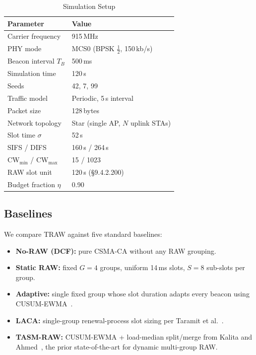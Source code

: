 \documentclass[conference]{IEEEtran}
\begin{document}
\begin{table}[!t]
\renewcommand{\arraystretch}{1.15}
\caption{Simulation Setup}
\label{tab:setup}
\centering
\begin{tabular}{@{}ll@{}}
\toprule
\textbf{Parameter} & \textbf{Value} \\
\midrule
Carrier frequency      & 915\,MHz \\
PHY mode               & MCS0 (BPSK $\frac{1}{2}$, 150\,kb/s) \\
Beacon interval $T_B$  & 500\,ms \\
Simulation time        & 120\,s \\
Seeds                  & 42, 7, 99 \\
Traffic model          & Periodic, 5\,s interval \\
Packet size            & 128\,bytes \\
Network topology       & Star (single AP, $N$ uplink STAs) \\
Slot time $\sigma$     & 52\,\textmu{}s \\
SIFS / DIFS            & 160\,\textmu{}s / 264\,\textmu{}s \\
CW$_\mathrm{min}$ / CW$_\mathrm{max}$ & 15 / 1023 \\
RAW slot unit          & 120\,\textmu{}s (\S9.4.2.200) \\
Budget fraction $\eta$ & 0.90 \\
\bottomrule
\end{tabular}
\end{table}

\subsection{Baselines}

We compare TRAW against five standard baselines:
\begin{itemize}
  \item \textbf{No-RAW (DCF):} pure CSMA-CA without any RAW grouping.
  \item \textbf{Static RAW:} fixed $G\!=\!4$ groups, uniform 14\,ms slots,
        $S\!=\!8$ sub-slots per group.
  \item \textbf{Adaptive:} single fixed group whose slot duration adapts
        every beacon using CUSUM-EWMA~\cite{kalita2025}.
  \item \textbf{LACA:} single-group renewal-process slot sizing per
        Taramit et al.~\cite{taramit2023}.
  \item \textbf{TASM-RAW:} CUSUM-EWMA + load-median split/merge from
        Kalita and Ahmed~\cite{kalita2025b}, the prior state-of-the-art
        for dynamic multi-group RAW.
\end{itemize}
\end{document}
